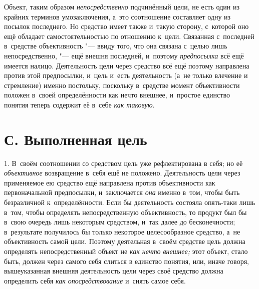 Объект, таким образом
{\em непосредственно}
подчинённый цели, не есть один из крайних терминов
умозаключения, а~это соотношение составляет одну из посылок последнего. Но
средство имеет также и~такую сторону, с~которой оно ещё обладает
самостоятельностью по отношению к~цели. Связанная с~последней в~средстве
объективность "--- ввиду того, что она связана с~целью лишь
непосредственно, "--- ещё внешня последней, и~поэтому
{\em предпосылка} всё ещё
имеется налицо. Деятельность цели через средство всё ещё поэтому направлена
против этой предпосылки, и~цель и~есть деятельность (а~не только влечение и
стремление) именно постольку, поскольку в~средстве момент объективности
положен в~своей определённости как нечто внешнее, и~простое единство
понятия теперь содержит её в~себе
{\em как таковую}.

\section[С. Выполненная цель]{С. Выполненная цель}

1. В~своём соотношении со средством цель уже рефлектирована в
себя; но её {\em объективное}
возвращение в~себя ещё не положено. Деятельность цели через
применяемое ею средство ещё направлена против объективности как
первоначальной предпосылки, и~заключается
{\em она} именно в~том,
чтобы быть безразличной к~определённости. Если бы деятельность состояла
опять-таки лишь в~том, чтобы определять непосредственную объективность, то
продукт был бы в~свою очередь лишь некоторым средством, и~так далее до
бесконечности; в~результате получилось бы только некоторое целесообразное
средство, а~не объективность самой цели. Поэтому деятельная в~своём
средстве цель должна определять непосредственный объект не
{\em как нечто внешнее;}
этот объект, стало быть, должен через самого себя слиться в
единство понятия, или, иначе говоря, вышеуказанная внешняя деятельность
цели через своё средство должна определить себя
{\em как опосредствование} и~снять самое себя.

